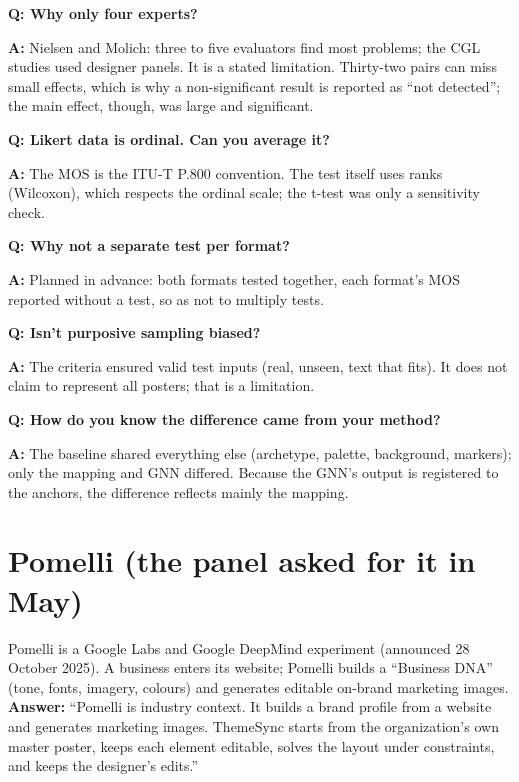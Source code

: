 \documentclass[10pt,a4paper]{article}
\newcommand{\Q}[1]{\par\smallskip\textbf{\color{navy}Q: #1}\par}
\newcommand{\A}{\textbf{A:} }
\begin{document}
\Q{Why only four experts?}
\A Nielsen and Molich: three to five evaluators find most problems; the CGL studies used designer panels. It is a stated limitation. Thirty-two pairs can miss small effects, which is why a non-significant result is reported as ``not detected''; the main effect, though, was large and significant.
\Q{Likert data is ordinal. Can you average it?}
\A The MOS is the ITU-T P.800 convention. The test itself uses ranks (Wilcoxon), which respects the ordinal scale; the t-test was only a sensitivity check.
\Q{Why not a separate test per format?}
\A Planned in advance: both formats tested together, each format's MOS reported without a test, so as not to multiply tests.
\Q{Isn't purposive sampling biased?}
\A The criteria ensured valid test inputs (real, unseen, text that fits). It does not claim to represent all posters; that is a limitation.
\Q{How do you know the difference came from your method?}
\A The baseline shared everything else (archetype, palette, background, markers); only the mapping and GNN differed. Because the GNN's output is registered to the anchors, the difference reflects mainly the mapping.

\section{Pomelli (the panel asked for it in May)}
Pomelli is a Google Labs and Google DeepMind experiment (announced 28 October 2025). A business enters its website; Pomelli builds a ``Business DNA'' (tone, fonts, imagery, colours) and generates editable on-brand marketing images. \textbf{Answer:} ``Pomelli is industry context. It builds a brand profile from a website and generates marketing images. ThemeSync starts from the organization's own master poster, keeps each element editable, solves the layout under constraints, and keeps the designer's edits.''


\end{document}
